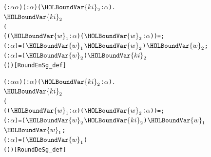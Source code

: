 \documentclass{article}
\begin{document}
\begin{alltt}
\HOLTokenTurnstile{} \HOLSymConst{\HOLTokenForall{}}( :\ensuremath{\alpha}  \HOLTokenProd{} \ensuremath{\alpha} ) ( :\ensuremath{\alpha} ) (\ensuremath{\HOLBoundVar{ki}\sb{\mathrm{2}}} :\ensuremath{\alpha} ).
        \ensuremath{\HOLBoundVar{ki}\sb{\mathrm{2}}} \HOLSymConst{=}
     (
        ((\ensuremath{\HOLBoundVar{w}\sb{\mathrm{1}}} :\ensuremath{\alpha} )\HOLSymConst{,}(\ensuremath{\HOLBoundVar{w}\sb{\mathrm{2}}} :\ensuremath{\alpha} )) = ;
        ( :\ensuremath{\alpha} ) = (\ensuremath{\HOLBoundVar{w}\sb{\mathrm{1}}} \HOLSymConst{\HOLTokenEor{}} \ensuremath{\HOLBoundVar{w}\sb{\mathrm{2}}}) \HOLSymConst{\HOLTokenRol{}}  \ensuremath{\HOLBoundVar{w}\sb{\mathrm{2}}} \HOLSymConst{\ensuremath{+}} ;
        ( :\ensuremath{\alpha} ) = (\ensuremath{\HOLBoundVar{w}\sb{\mathrm{2}}} \HOLSymConst{\HOLTokenEor{}} ) \HOLSymConst{\HOLTokenRol{}}   \HOLSymConst{\ensuremath{+}} \ensuremath{\HOLBoundVar{ki}\sb{\mathrm{2}}}
        (\HOLSymConst{,}))\hfill{[RoundEnSg_def]}
\end{alltt}

\begin{alltt}
\HOLTokenTurnstile{} \HOLSymConst{\HOLTokenForall{}}( :\ensuremath{\alpha}  \HOLTokenProd{} \ensuremath{\alpha} ) ( :\ensuremath{\alpha} ) (\ensuremath{\HOLBoundVar{ki}\sb{\mathrm{2}}} :\ensuremath{\alpha} ).
        \ensuremath{\HOLBoundVar{ki}\sb{\mathrm{2}}} \HOLSymConst{=}
     (
        ((\ensuremath{\HOLBoundVar{w}\sb{\mathrm{1}}} :\ensuremath{\alpha} )\HOLSymConst{,}(\ensuremath{\HOLBoundVar{w}\sb{\mathrm{2}}} :\ensuremath{\alpha} )) = ;
        ( :\ensuremath{\alpha} ) = (\ensuremath{\HOLBoundVar{w}\sb{\mathrm{2}}} \HOLSymConst{\ensuremath{-}} \ensuremath{\HOLBoundVar{ki}\sb{\mathrm{2}}}) \HOLSymConst{\HOLTokenRor{}}  \ensuremath{\HOLBoundVar{w}\sb{\mathrm{1}}} \HOLSymConst{\HOLTokenEor{}} \ensuremath{\HOLBoundVar{w}\sb{\mathrm{1}}};
        ( :\ensuremath{\alpha} ) = (\ensuremath{\HOLBoundVar{w}\sb{\mathrm{1}}} \HOLSymConst{\ensuremath{-}} ) \HOLSymConst{\HOLTokenRor{}}   \HOLSymConst{\HOLTokenEor{}} 
        (\HOLSymConst{,}))\hfill{[RoundDeSg_def]}
\end{alltt}
\end{document}
